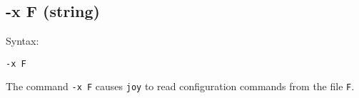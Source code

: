 \documentclass{book}
\begin{document}

\subsection{-x F (string)}
\label{x}
\begin{mdframed}[style=aaa]
Syntax:
  \begin{verbatim}
-x F                      
  \end{verbatim}
\end{mdframed}
The command \texttt{-x F} causes \texttt{joy} to read configuration commands
from the file \texttt{F}.
\end{document}
